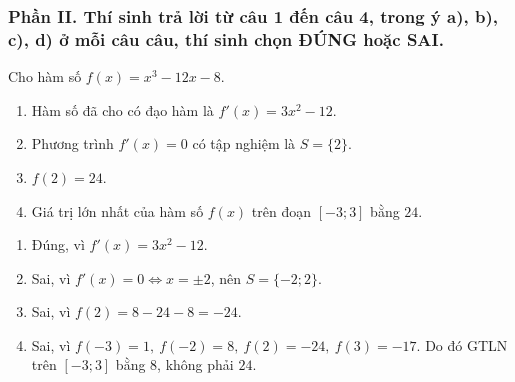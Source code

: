 \subsubsection*{Phần II. Thí sinh trả lời từ câu 1 đến câu 4, trong ý a), b), c), d) ở mỗi câu câu, thí sinh chọn ĐÚNG hoặc SAI.}
\setcounter{bt}{0}
\begin{baitap}
	Cho hàm số $f(x) = x^3 - 12x - 8$.
	\begin{enumerate}
		\item Hàm số đã cho có đạo hàm là $f'(x) = 3x^2 - 12$.
		\item Phương trình $f'(x) = 0$ có tập nghiệm là $S = \{2\}$.
		\item $f(2) = 24$.
		\item Giá trị lớn nhất của hàm số $f(x)$ trên đoạn $[-3; 3]$ bằng $24$.
	\end{enumerate}
	\begin{traloi}
		\begin{enumerate}
			\item Đúng, vì \(f'(x)=3x^2-12\).
			\item Sai, vì \(f'(x)=0\iff x=\pm2\), nên \(S=\{-2;2\}\).
			\item Sai, vì \(f(2)=8-24-8=-24\).
			\item Sai, vì \(f(-3)=1,\ f(-2)=8,\ f(2)=-24,\ f(3)=-17\). Do đó GTLN trên \([-3;3]\) bằng \(8\), không phải \(24\).
		\end{enumerate}
	\end{traloi}
\end{baitap}
